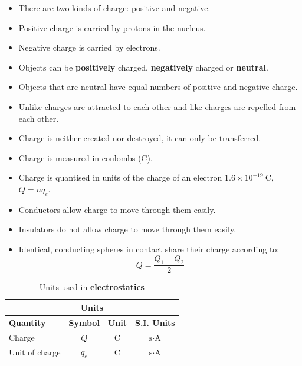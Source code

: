       \label{m38781*id201947}\begin{itemize}[noitemsep ] 
\item There are two kinds of charge: positive and negative.
\item Positive charge is carried by protons in the nucleus.
\item Negative charge is carried by electrons.
            \label{m38781*uid14}\item Objects can be \textbf{positively} charged, \textbf{negatively} charged or \textbf{neutral}.
\label{m38781*uid15}\item Objects that are neutral have equal numbers of positive and negative charge.

\label{m38781*uid16}\item Unlike charges are attracted to each other and like charges are repelled from each other.
\label{m38781*uid17}\item Charge is neither created nor destroyed, it can only be transferred.
\label{m38781*uid18}\item Charge is measured in coulombs (C).
\item Charge is quantised in units of the charge of an electron $1.6\times10^{-19}~\text{C}$, $Q=nq_{e}$. 
\label{m38781*uid19}\item Conductors allow charge to move through them easily.
\label{m38781*uid20}\item Insulators do not allow charge to move through them easily.
\item Identical, conducting spheres in contact share their charge according to:
\begin{equation*}
 Q=\frac{Q_1+Q_2}{2}
\end{equation*}
\end{itemize}
\begin{table}[H]
\begin{center}
\begin{tabular}{|l|c|c|c|}\hline \hline 
\multicolumn{4}{|c|}{\textbf{Units}}\\ \hline \hline
\textbf{Quantity} & \textbf{Symbol} & \textbf{Unit} & \textbf{S.I. Units}\\ \hline
Charge & $Q$ & C & $\text{s}\cdot\text{A}$ \\ \hline
Unit of charge & $q_e$ & C & $\text{s}\cdot\text{A}$ \\ \hline
\end{tabular}
\end{center}
\caption{Units used in \textbf{electrostatics} }
\label{table:electrostatics::units}
\end{table}
